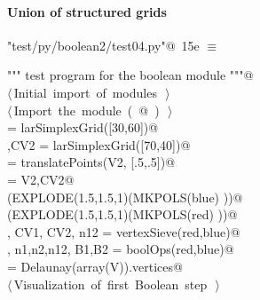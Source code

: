 \documentclass[11pt,oneside]{article}	%
\begin{document}
\paragraph{Union of structured grids}

\begin{flushleft} \small
\begin{minipage}{\linewidth} \label{scrap30}
\protect{}\verb@"test/py/boolean2/test04.py"@\nobreak\ {\footnotesize 15e }$\equiv$
\vspace{-1ex}
\begin{list}{}{} \item
\mbox{}\verb@""" test program for the boolean module """@\\
\mbox{}\verb@@\hbox{$\langle\,$Initial import of modules\nobreak\ {\footnotesize {}}$\,\rangle$}\verb@@\\
\mbox{}\verb@@\hbox{$\langle\,$Import the module\nobreak\ ({\footnotesize {}\label{scrap31}
 }\mbox{}@ ) {\footnotesize {}}$\,\rangle$}\verb@@\\
\mbox{}\verb@blue = larSimplexGrid([30,60])@\\
\mbox{},CV2 = larSimplexGrid([70,40])@\\
\mbox{} = translatePoints(V2, [.5,.5])@\\
\mbox{}\verb@red = V2,CV2@\\
\mbox{}\verb@VIEW(EXPLODE(1.5,1.5,1)(MKPOLS(blue) ))@\\
\mbox{}\verb@VIEW(EXPLODE(1.5,1.5,1)(MKPOLS(red) ))@\\
\mbox{}\verb@V, CV1, CV2, n12 = vertexSieve(red,blue)@\\
\mbox{}\verb@V, n1,n2,n12, B1,B2 = boolOps(red,blue)@\\
\mbox{}\verb@CV = Delaunay(array(V)).vertices@\\
\mbox{}\verb@@\hbox{$\langle\,$Visualization of first Boolean step\nobreak\ {\footnotesize {}}$\,\rangle$}\verb@@\\
\mbox{}\verb@@{\NWsep}
\end{list}
\vspace{-2ex}
\end{minipage}\\[4ex]
\end{flushleft}
\end{document}
